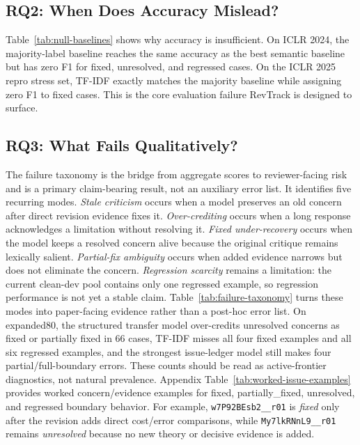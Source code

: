 \subsection{RQ2: When Does Accuracy Mislead?}



Table~\ref{tab:null-baselines} shows why accuracy is insufficient.
On ICLR 2024, the majority-label baseline reaches the same accuracy as the best semantic baseline but has zero F1 for fixed, unresolved, and regressed cases.
On the ICLR 2025 repro stress set, TF-IDF exactly matches the majority baseline while assigning zero F1 to fixed cases.
This is the core evaluation failure RevTrack is designed to surface.

\subsection{RQ3: What Fails Qualitatively?}

The failure taxonomy is the bridge from aggregate scores to reviewer-facing risk and is a primary claim-bearing result, not an auxiliary error list.
It identifies five recurring modes.
\textit{Stale criticism} occurs when a model preserves an old concern after direct revision evidence fixes it.
\textit{Over-crediting} occurs when a long response acknowledges a limitation without resolving it.
\textit{Fixed under-recovery} occurs when the model keeps a resolved concern alive because the original critique remains lexically salient.
\textit{Partial-fix ambiguity} occurs when added evidence narrows but does not eliminate the concern.
\textit{Regression scarcity} remains a limitation: the current clean-dev pool contains only one regressed example, so regression performance is not yet a stable claim.
Table~\ref{tab:failure-taxonomy} turns these modes into paper-facing evidence rather than a post-hoc error list.
On expanded80, the structured transfer model over-credits unresolved concerns as fixed or partially fixed in 66 cases, TF-IDF misses all four fixed examples and all six regressed examples, and the strongest issue-ledger model still makes four partial/full-boundary errors.
These counts should be read as active-frontier diagnostics, not natural prevalence.
Appendix Table~\ref{tab:worked-issue-examples} provides worked concern/evidence examples for fixed, partially\_fixed, unresolved, and regressed boundary behavior.
For example, \texttt{w7P92BEsb2\_\_r01} is \textit{fixed} only after the revision adds direct cost/error comparisons, while \texttt{My7lkRNnL9\_\_r01} remains \textit{unresolved} because no new theory or decisive evidence is added.

